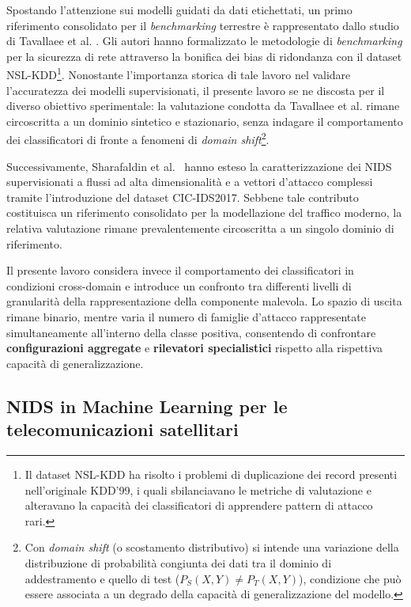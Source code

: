 Spostando l'attenzione sui modelli guidati da dati etichettati, un primo riferimento consolidato per il \textit{benchmarking} terrestre è rappresentato dallo studio di Tavallaee et al. \cite{tavallaee2009}. 
Gli autori hanno formalizzato le metodologie di \textit{benchmarking} per la sicurezza di rete attraverso la bonifica dei bias di ridondanza con il dataset NSL-KDD\footnote{Il dataset NSL-KDD ha risolto i problemi di duplicazione dei record presenti nell'originale KDD'99, i quali sbilanciavano le metriche di valutazione e alteravano la capacità dei classificatori di apprendere pattern di attacco rari.}. 
Nonostante l'importanza storica di tale lavoro nel validare l'accuratezza dei modelli supervisionati, il presente lavoro se ne discosta per il diverso obiettivo sperimentale: la valutazione condotta da Tavallaee et al. rimane circoscritta a un dominio sintetico e stazionario, senza indagare il comportamento dei classificatori di fronte a fenomeni di \textit{domain shift}\footnote{Con \textit{domain shift} (o scostamento distributivo) si intende una variazione della distribuzione di probabilità congiunta dei dati tra il dominio di addestramento e quello di test ($P_S(X,Y) \neq P_T(X,Y)$), condizione che può essere associata a un degrado della capacità di generalizzazione del modello.}.

Successivamente, Sharafaldin et al.~\cite{sharafaldin2018} hanno esteso la caratterizzazione dei NIDS supervisionati a flussi ad alta dimensionalità e a vettori d'attacco complessi tramite l'introduzione del dataset CIC-IDS2017.
Sebbene tale contributo costituisca un riferimento consolidato per la modellazione del traffico moderno, la relativa valutazione rimane prevalentemente circoscritta a un singolo dominio di riferimento.

Il presente lavoro considera invece il comportamento dei classificatori in condizioni cross-domain e introduce un confronto tra differenti livelli di granularità della rappresentazione della componente malevola.
Lo spazio di uscita rimane binario, mentre varia il numero di famiglie d'attacco rappresentate simultaneamente all'interno della classe positiva, consentendo di confrontare \textbf{configurazioni aggregate} e \textbf{rilevatori specialistici} rispetto alla rispettiva capacità di generalizzazione.

\subsection{NIDS in Machine Learning per le telecomunicazioni satellitari}
\label{subsec:ids_satellitari}

